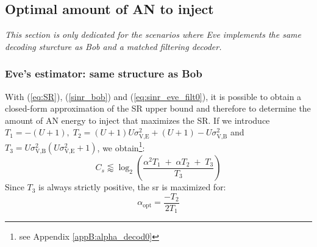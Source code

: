 \subsection{Optimal amount of AN to inject}
\label{subsec:best_alpha}
\textit{This section is only dedicated for the scenarios where Eve implements the same decoding sturcture as Bob and a matched filtering decoder.}

\subsubsection{Eve's estimator: same structure as Bob}
With (\ref{eq:SR}), (\ref{sinr_bob}) and (\ref{eq:sinr_eve_filt0}), it is possible to obtain a closed-form approximation of the SR upper bound and therefore to determine the amount of AN energy to inject that maximizes the SR. If we introduce $T_1=-(U+1),  \; T_2 = (U+1)U\sigma_{\text{V,E}}^2 + (U+1) - U\sigma_{\text{V,B}}^2 $ and $T_3 = U\sigma_{\text{V,B}}^2(U\sigma_{\text{V,E}}^2+1)$, we obtain\footnote{see Appendix \ref{appB:alpha_decod0}}:
\begin{equation}
C_s \lessapprox \log_2 \left( \frac{\alpha^2 T_1 \; + \; \alpha T_2 \; + \; T_3}{T_3} \right)
\label{eq:SR_anal2_decod_0}
\end{equation}
Since $T_3$ is always strictly positive, the \gls{sr} is maximized for:
\begin{equation}
	\alpha_{\text{opt}} = \frac{-T_2}{2T_1}
	\label{eq:optimal_alpha_decod_0}
\end{equation}



